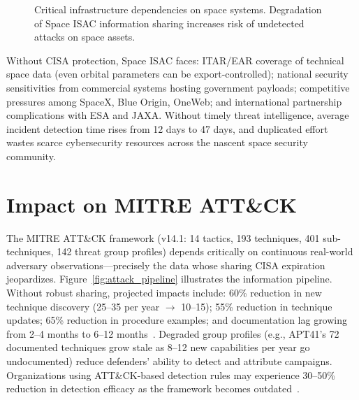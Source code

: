 \documentclass[journal]{IEEEtran}
\begin{document}
\begin{figure}[!t]
\centering
{}
\caption{Critical infrastructure dependencies on space systems. Degradation of Space ISAC information sharing increases risk of undetected attacks on space assets.}
\label{fig:space_dependencies}
\end{figure}

Without CISA protection, Space ISAC faces: ITAR/EAR coverage of technical space data (even orbital parameters can be export-controlled); national security sensitivities from commercial systems hosting government payloads; competitive pressures among SpaceX, Blue Origin, OneWeb; and international partnership complications with ESA and JAXA. Without timely threat intelligence, average incident detection time rises from 12 days to 47 days, and duplicated effort wastes scarce cybersecurity resources across the nascent space security community.

\section{Impact on MITRE ATT\&CK}

The MITRE ATT\&CK framework (v14.1: 14 tactics, 193 techniques, 401 sub-techniques, 142 threat group profiles) depends critically on continuous real-world adversary observations---precisely the data whose sharing CISA expiration jeopardizes. Figure~\ref{fig:attack_pipeline} illustrates the information pipeline. Without robust sharing, projected impacts include: 60\% reduction in new technique discovery (25--35 per year $\to$ 10--15); 55\% reduction in technique updates; 65\% reduction in procedure examples; and documentation lag growing from 2--4 months to 6--12 months~\cite{pols2024impact}. Degraded group profiles (e.g., APT41's 72 documented techniques grow stale as 8--12 new capabilities per year go undocumented) reduce defenders' ability to detect and attribute campaigns. Organizations using ATT\&CK-based detection rules may experience 30--50\% reduction in detection efficacy as the framework becomes outdated~\cite{insider2024effectiveness}.
\end{document}
